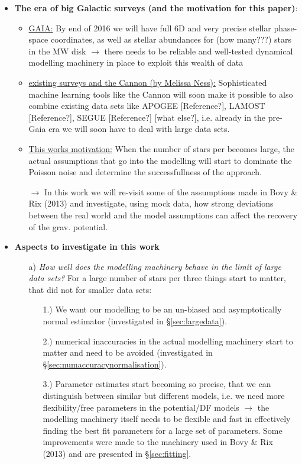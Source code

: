 \begin{itemize}
\item \textbf{The era of big Galactic surveys (and the motivation for this paper)}:
\begin{itemize}
\item \underline{GAIA:} By end of 2016 we will have full 6D and very precise stellar phase-space coordinates, as well as stellar abundances for (how many???) stars in the MW disk $\rightarrow$ there needs to be reliable and well-tested dynamical modelling machinery in place to exploit this wealth of data
\item \underline{existing surveys and the Cannon (by Melissa Ness):} Sophisticated machine learning tools like the Cannon will soon make it possible to also combine existing data sets like APOGEE [Reference?], LAMOST [Reference?], SEGUE [Reference?] [what else?], i.e. already in the pre-Gaia era we will soon have to deal with large data sets.
\item \underline{This works motivation:} When the number of stars per \MAP becomes large, the actual assumptions that go into the modelling will start to dominate the Poisson noise and determine the successfullness of the approach.
\item[$\rightarrow$] In this work we will re-visit some of the assumptions made in Bovy \& Rix (2013) and investigate, using mock data, how strong deviations between the real world and the model assumptions can affect the recovery of the grav. potential.
\end{itemize}

\item \textbf{Aspects to investigate in this work}
\begin{itemize}

\item[a)] \emph{How well does the modelling machinery behave in the limit of large data sets?} For a large number of stars per \MAP three things start to matter, that did not for smaller data sets:
\begin{itemize} 
\item[1.)] We want our modelling to be an un-biased and asymptotically normal estimator (investigated in \S\ref{sec:largedata}). 
\item[2.)] numerical inaccuracies in the actual modelling machinery start to matter and need to be avoided (investigated in \S\ref{sec:numaccuracynormalisation}). 
\item[3.)] Parameter estimates start becoming so precise, that we can distinguish between similar but different models, i.e. we need more flexibility/free parameters in the potential/DF models $\longrightarrow$ the modelling machinery itself needs to be flexible and fast in effectively finding the best fit parameters for a large set of parameters. Some improvements were made to the machinery used in Bovy \& Rix (2013) and are presented in \S\ref{sec:fitting}.
\end{itemize}


\end{itemize}
\end{itemize}
